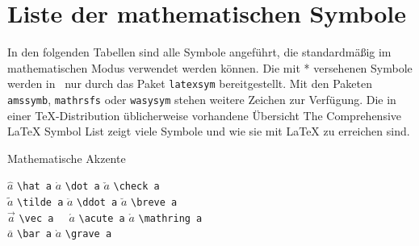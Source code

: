 

\section{Liste der mathematischen Symbole}  \label{symbols}

In den folgenden Tabellen sind alle Symbole angeführt, die
standardmäßig im mathematischen Modus verwendet werden
können.  Die mit * versehenen Symbole werden
in \LaTeXe\ nur durch das Paket \texttt{latexsym} bereitgestellt. 
Mit den Paketen \texttt{amssymb}, 
\texttt{mathrsfs} oder \texttt{wasysym} stehen weitere Zeichen zur 
Verfügung. Die in einer \TeX-Distribution üblicherweise vorhandene Übersicht { The Comprehensive \LaTeX{} Symbol List}\cite{symbols} zeigt viele Symbole und wie sie mit \LaTeX{} zu erreichen sind.


\begin{table}[hbp]
\caption{Mathematische Akzente}  \label{mathakz}
\begin{symbols}
$\hat a$    \> \lstinline|\hat a|   \> $\dot a$   \> \lstinline|\dot a|   \> $\check a$    \> \lstinline|\check a|    \\ 
$\tilde a$  \> \lstinline|\tilde a| \> $\ddot a$  \> \lstinline|\ddot a|  \> $\breve a$    \> \lstinline|\breve a|    \\
$\vec a$    \> \lstinline|\vec a  | \> $\acute a$ \> \lstinline|\acute a| \> $\mathring a$ \> \lstinline|\mathring a| \\
$\bar a$    \> \lstinline|\bar a|   \> $\grave a$ \> \lstinline|\grave a| \\
\end{symbols}
\end{table}

